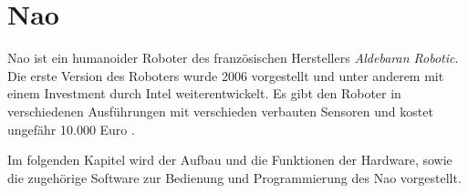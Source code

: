 \chapter{Nao}\label{c:nao}
Nao ist ein humanoider Roboter des französischen Herstellers \textit{Aldebaran Robotic}. Die erste Version des Roboters wurde 2006 vorgestellt und unter anderem mit einem Investment durch Intel weiterentwickelt. Es gibt den Roboter in verschiedenen Ausführungen mit verschieden verbauten Sensoren und kostet ungefähr 10.000 Euro \cite{ws:wikinao}.

Im folgenden Kapitel wird der Aufbau und die Funktionen der Hardware, sowie die zugehörige Software zur Bedienung und Programmierung des Nao vorgestellt.




